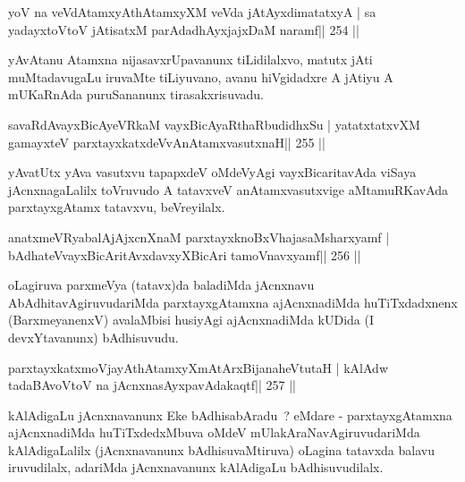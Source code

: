 
\begin{shl}
yoV na veVdA\s\s tamxyAthAtamxyXM veVda jAtAyxdimatatxyA |
sa yadayxtoV\s toV jAtisatxM parAdadhAyxjajxDaM naramf\hfill || 254 ||
\end{shl}

\begin{artha}
yAvAtanu Atamxna nijasavxrUpavanunx tiLidilalxvo, matutx jAti muMtadavugaLu iruvaMte tiLiyuvano, avanu hiVgidadxre A jAtiyu A mUKaRnAda puruSananunx tirasakxrisuvadu.
\end{artha}


\begin{shl}
savaRdA\s vayxBicAyeVRkaM vayxBicAyaRthaRbudidhxSu |
yatatxtatxvXM gamayxteV parxtayxkatxdeVvAnAtamxvasutxnaH\hfill || 255 ||
\end{shl}

\begin{artha}
yAvatUtx yAva vasutxvu tapapxdeV oMdeVyAgi vayxBicaritavAda viSaya jAcnxnagaLalilx toVruvudo A tatavxveV anAtamxvasutxvige aMtamuRKavAda parxtayxgAtamx tatavxvu, beVreyilalx.
\end{artha}


\begin{shl}
anatxmeVRyabalAjAjxcnXnaM parxtayxknoBxVhajasaMsharxyamf |
bAdhateV\s vayxBicAritAvxdavxyXBicAri tamoVnavxyamf\hfill || 256 ||
\end{shl}

\begin{artha}
oLagiruva parxmeVya (tatavx)da baladiMda jAcnxnavu AbAdhitavAgiruvudariMda parxtayxgAtamxna ajAcnxnadiMda huTiTxdadxnenx (BarxmeyanenxV) avalaMbisi husiyAgi ajAcnxnadiMda kUDida (I devxYtavanunx) bAdhisuvudu.
\end{artha}

\begin{shl}
parxtayxkatxmoVjayAthAtamxyXmAtArxBijanaheVtutaH |
kAlAdw tadaBAvoV\s toV na jAcnxnasAyxpavAdakaqtf\hfill || 257 ||
\end{shl}

\begin{artha}
kAlAdigaLu jAcnxnavanunx Eke bAdhisabAradu~? eMdare - parxtayxgAtamxna ajAcnxnadiMda huTiTxdedxMbuva oMdeV mUlakAraNavAgiruvudariMda kAlAdigaLalilx (jAcnxnavanunx bAdhisuvaMtiruva) oLagina tatavxda balavu iruvudilalx, adariMda jAcnxnavanunx kAlAdigaLu bAdhisuvudilalx.
\end{artha}

